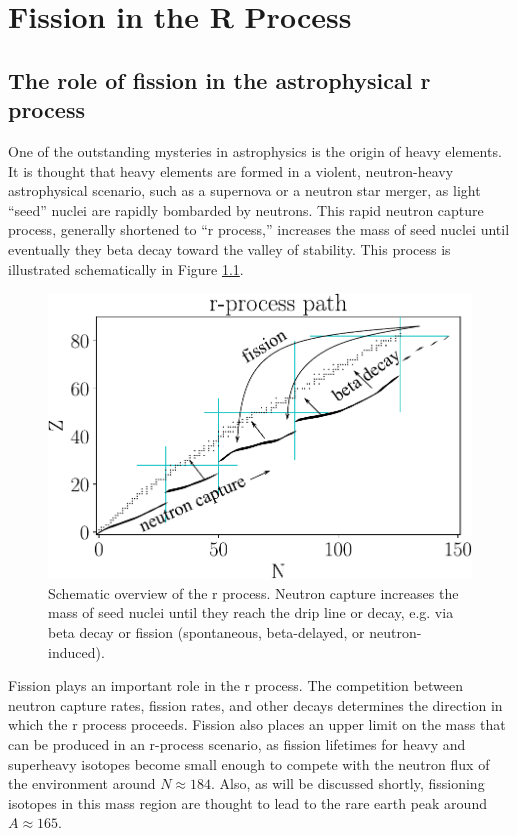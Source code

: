 \chapter{Fission in the R Process}\label{chap:rprocess}

\section{The role of fission in the astrophysical r process}
One of the outstanding mysteries in astrophysics is the origin of heavy elements. It is thought that heavy elements are formed in a violent, neutron-heavy astrophysical scenario, such as a supernova or a neutron star merger, as light ``seed'' nuclei are rapidly bombarded by neutrons. This rapid neutron capture process, generally shortened to ``r process,'' increases the mass of seed nuclei until eventually they beta decay toward the valley of stability.  This process is illustrated schematically in Figure \ref{fig:rprocpath}.

\begin{figure}
	\centering
	\includegraphics[width=0.8\linewidth]{TeX_files/rProc_path}
	\caption[Schematic overview of the r process]{Schematic overview of the r process. Neutron capture increases the mass of seed nuclei until they reach the drip line or decay, e.g. via beta decay or fission (spontaneous, beta-delayed, or neutron-induced).}
	\label{fig:rprocpath}
\end{figure}

Fission plays an important role in the r process. The competition between neutron capture rates, fission rates, and other decays determines the direction in which the r process proceeds. Fission also places an upper limit on the mass that can be produced in an r-process scenario, as fission lifetimes for heavy and superheavy isotopes become small enough to compete with the neutron flux of the environment around $N\approx184$. Also, as will be discussed shortly, fissioning isotopes in this mass region are thought to lead to the rare earth peak around $A\approx165$.

